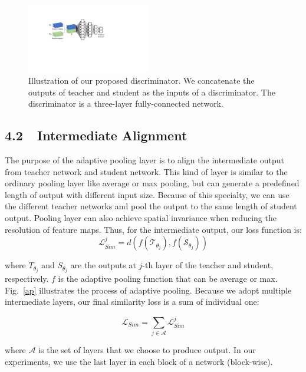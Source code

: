 \documentclass[letterpaper]{article} %
\newcommand{\LL}{\mathcal{L}}
\begin{document}
\begin{figure}[t]
	\centering
	\includegraphics[width=0.48\textwidth]{figs/D_new}
	\vspace{-0.18in}
	\caption{Illustration of our proposed discriminator. We concatenate the outputs of teacher and student as the inputs of a discriminator. The discriminator is a three-layer fully-connected network.}
	\label{d}
	\vspace{-0.1in}
\end{figure}

\subsection{4.2~~Intermediate Alignment}
 The purpose of the adaptive pooling layer is to align the intermediate output from teacher network and student network. This kind of layer is similar to the ordinary pooling layer like average or max pooling, but can generate a predefined length of output with different input size. Because of this specialty, we can use the different teacher networks and pool the output to the same length of student output. Pooling layer can also achieve spatial invariance when reducing the resolution of feature maps. Thus, for the intermediate output, our loss function is:
\begin{equation}
\LL^j_{Sim} = d(f(\mathcal{T}_{{\theta}_j}), f(\mathcal{S}_{{\theta}_j}))
\end{equation}

where $T_{{\theta}_j}$ and $S_{{\theta}_j}$ are the outputs at $j$-th layer of the teacher and student, respectively. $f$ is the adaptive pooling function that can be average or max. Fig.~\ref{ap} illustrates the process of  adaptive pooling. Because we adopt multiple intermediate layers, our final similarity loss is a sum of individual one:

\begin{equation} \label{sim}
\LL_{Sim}  = \sum\limits_{j\in {\mathcal{A}} } {\LL^j_{Sim}}
\end{equation}

where $\mathcal{A}$ is the set of layers that we choose to produce output. In our experiments, we use the last layer in each block of a network (block-wise).
\end{document}
